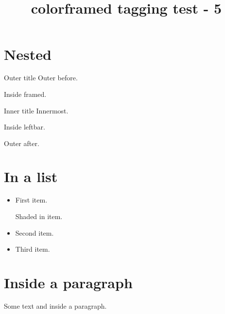 \documentclass{article}
\title{colorframed tagging test - 5}
\begin{document}
\section{Nested}

\begin{titled-frame}{Outer title}
Outer before.
\begin{framed}
Inside framed.
\begin{titled-frame}{Inner title}
Innermost.
\end{titled-frame}
\end{framed}
\begin{leftbar}
Inside leftbar.
\end{leftbar}
Outer after.
\end{titled-frame}

\section{In a list}

\begin{itemize}
\item First item.
\begin{snugshade}
Shaded in item.
\end{snugshade}
\item Second item.
\begin{framed}
\kant[1-5]
\end{framed}
\item Third item.
\end{itemize}

\section{Inside a paragraph}

Some text  and
 inside a paragraph.
\end{document}

